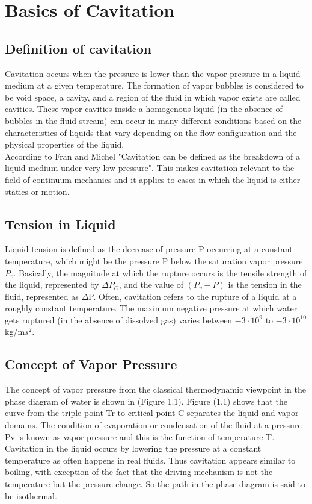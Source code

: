 \chapter{Basics of Cavitation}
\label{chap:chapter1}
\section{Definition of cavitation}

Cavitation occurs when the pressure is lower than the vapor pressure
in a liquid medium at a given temperature. The formation of vapor
bubbles is considered to be void space, a cavity, and a region of the
fluid in which vapor exists are called cavities. These vapor cavities
inside a homogenous liquid (in the absence of bubbles in the fluid
stream) can occur in many different conditions based on the
characteristics of liquids that vary depending on the flow
configuration and the physical properties of the liquid.\\

According to Fran and Michel \cite{FundamentalsofCavitation.2004}
"Cavitation can be defined as the breakdown of a liquid medium under
very low pressure".  This makes cavitation relevant to the field of
continuum mechanics and it applies to cases in which the liquid is
either statics or motion.\\

\section{Tension in Liquid}
Liquid tension is defined as the decrease of pressure P occurring at a constant temperature, 
which might be the pressure P below the saturation vapor pressure $P_v$. Basically, 
the magnitude at which the rupture occurs is the tensile strength of the liquid, represented 
by $\Delta P_C$, and the value of $({P_v}-P)$ is the tension in the fluid, represented as 
$\Delta$P. Often, cavitation refers to the rupture of a liquid at a roughly constant 
temperature. The maximum negative pressure at which water gets ruptured (in the absence of dissolved gas) varies between $-3\cdot 10^9$ to $ -3\cdot
10^{10} $ kg/m$s^2$.
\section{Concept of Vapor Pressure} 
The concept of vapor pressure from the classical thermodynamic
viewpoint in the phase diagram of water is shown in (Figure 1.1). Figure (1.1) shows 
 that the curve from the triple point Tr to critical point C
separates the liquid and vapor domains. The condition of evaporation
or condensation of the fluid at a pressure Pv is known as vapor
pressure and this is the function of temperature T.  Cavitation in
the liquid occurs by lowering the pressure at a constant temperature
as often happens in real fluids. Thus cavitation appears similar to
boiling, with exception of the fact that the driving mechanism is not
the temperature but the pressure change. So the path in the phase diagram
is said to be isothermal.\\


